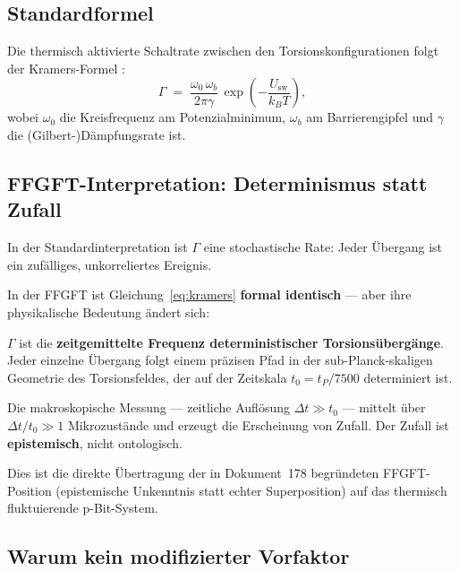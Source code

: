	\subsection{Standardformel}
	\label{subsec:kramers-standard}
	
	Die thermisch aktivierte Schaltrate zwischen den Torsionskonfigurationen
	folgt der Kramers-Formel \cite{Kramers1940, Hanggi1990}:
	\begin{equation}
		\Gamma \;=\; \frac{\omega_0\,\omega_b}{2\pi\gamma}
		\,\exp\!\left(-\frac{U_\text{sw}}{k_B T}\right),
		\label{eq:kramers}
	\end{equation}
	wobei $\omega_0$ die Kreisfrequenz am Potenzialminimum,
	$\omega_b$ am Barrierengipfel und $\gamma$ die (Gilbert-)Dämpfungsrate ist.
	
	\subsection{FFGFT-Interpretation: Determinismus statt Zufall}
	\label{subsec:kramers-ffgft}
	
	In der Standardinterpretation ist $\Gamma$ eine stochastische Rate:
	Jeder Übergang ist ein zufälliges, unkorreliertes Ereignis.
	
	\begin{foundation}
		In der FFGFT ist Gleichung~\eqref{eq:kramers} \textbf{formal identisch}
		--- aber ihre physikalische Bedeutung ändert sich:
		
		$\Gamma$ ist die \textbf{zeitgemittelte Frequenz deterministischer
			Torsionsübergänge}. Jeder einzelne Übergang folgt einem präzisen
		Pfad in der sub-Planck-skaligen Geometrie des Torsionsfeldes,
		der auf der Zeitskala $t_0 = t_P/7500$ determiniert ist.
		
		Die makroskopische Messung --- zeitliche Auflösung $\Delta t \gg t_0$ ---
		mittelt über $\Delta t/t_0 \gg 1$ Mikrozustände und erzeugt
		die Erscheinung von Zufall. Der Zufall ist \textbf{epistemisch},
		nicht ontologisch.
		
		Dies ist die direkte Übertragung der in Dokument~178 begründeten
		FFGFT-Position (epistemische Unkenntnis statt echter Superposition)
		auf das thermisch fluktuierende p-Bit-System.
	\end{foundation}
	
	\subsection{Warum kein modifizierter Vorfaktor}
	\label{subsec:kein-vorfaktor}
	
